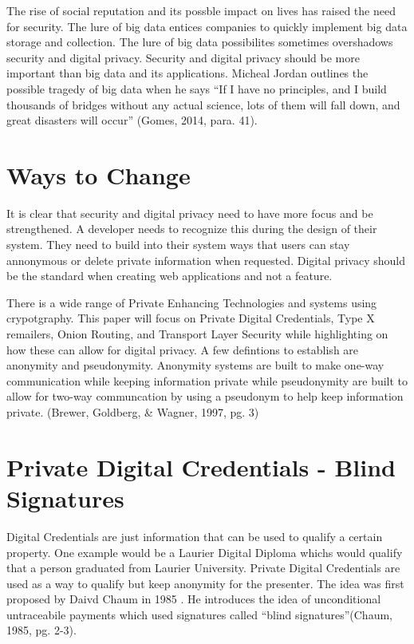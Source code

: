 \documentclass[12pt]{article}
\begin{document}
The rise of social reputation and its possble impact on lives has raised the need for security. The lure of big data entices companies to quickly implement big data storage and collection. The lure of big data possibilites sometimes overshadows security and digital privacy. Security and digital privacy should be more important than big data and its applications. Micheal Jordan outlines the possible tragedy of big data when he says ``If I have no principles, and I build thousands of bridges without any actual science, lots of them will fall down, and great disasters will occur'' (Gomes, 2014, para. 41).

\section{Ways to  Change}\label{sec:developers}
It is clear that security and digital privacy need to have more focus and be strengthened. A developer needs to recognize this during the design of their system. They need to build into their system ways that users can stay annonymous or delete private information when requested. Digital privacy should be the standard when creating web applications and not a feature.

There is a wide range of Private Enhancing Technologies and systems using crypotgraphy. This paper will focus on Private Digital Credentials, Type X remailers, Onion Routing, and Transport Layer Security while highlighting on how these can allow for digital privacy. A few defintions to establish are anonymity and pseudonymity. Anonymity systems are built to make one-way communication while keeping information private while pseudonymity are built to allow for two-way communcation by using a pseudonym to help keep information private. (Brewer, Goldberg, \& Wagner, 1997, pg. 3)

\section{Private Digital Credentials - Blind Signatures}\label{sec:PDC}
Digital Credentials are just information that can be used to qualify a certain property. One example would be a Laurier Digital Diploma whichs would qualify that a person graduated from Laurier University.  Private Digital Credentials are used as a way to qualify but keep anonymity for the presenter. The idea was first proposed by Daivd Chaum in 1985 . He introduces the idea of unconditional untraceabile payments which used signatures called ``blind signatures''(Chaum, 1985, pg. 2-3). 
\end{document}
